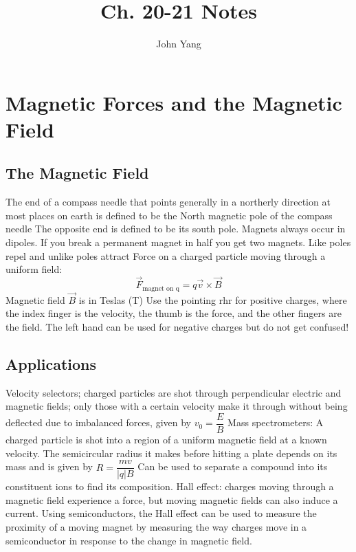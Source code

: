 \documentclass[twocolumn]{article}
\title{Ch. 20-21 Notes}
\author{John Yang}
\begin{document}
\maketitle
\section{Magnetic Forces and the Magnetic Field}
\subsection{The Magnetic Field}
\begin{outline}
	\1 The end of a compass needle that points generally in a northerly direction at most places on earth is defined to be the North magnetic pole of the compass needle
	\1 The opposite end is defined to be its south pole. 
	\1 Magnets always occur in dipoles. If you break a permanent magnet in half you get two magnets. 
	\1 Like poles repel and unlike poles attract
	\1 Force on a charged particle moving through a uniform field: \[\vec{F}_{\text{magnet on q}}=q\vec{v}\times\vec{B}\]
	\1 Magnetic field $\vec{B}$ is in Teslas (T)
	\1 Use the pointing rhr for positive charges, where the index finger is the velocity, the thumb is the force, and the other fingers are the field. The left hand can be used for negative charges but do not get confused!
\end{outline}
\subsection{Applications}
\begin{outline}
	\1 Velocity selectors; charged particles are shot through perpendicular electric and magnetic fields; only those with a certain velocity make it through without being deflected due to imbalanced forces, given by \(v_0=\dfrac{E}{B}\)
	\1 Mass spectrometers: A charged particle is shot into a region of a uniform magnetic field at a known velocity. The semicircular radius it makes before hitting a plate depends on its mass and is given by \(R=\dfrac{mv}{|q|B}\)
		\2 Can be used to separate a compound into its constituent ions to find its composition. 
	\1 Hall effect: charges moving through a magnetic field experience a force, but moving magnetic fields can also induce a current. Using semiconductors, the Hall effect can be used to measure the proximity of a moving magnet by measuring the way charges move in a semiconductor in response to the change in magnetic field. 

\end{outline}
\end{document}
